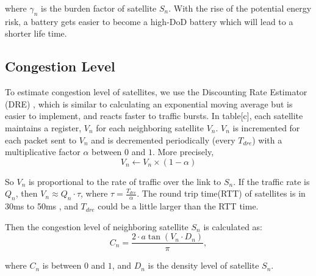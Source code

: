 where $\gamma_n$ is the burden factor of satellite $S_n$.
With the rise of the potential energy risk, a battery gets easier to become a high-DoD battery which will lead to a shorter life time.


\subsection{Congestion Level}
To estimate congestion level of satellites, we use the Discounting Rate Estimator (DRE) \cite{CONGA} , 
which is  similar to calculating an exponential moving average but is easier to implement,  and reacts faster to traffic bursts. 
In table[c], each satellite maintains a register, $V_n$ for each neighboring satellite $V_n$. 
$V_n$ is incremented for each packet sent to $V_n$  and is decremented periodically (every $T_{dre}$) with a multiplicative factor $\alpha$ between $0$ and $1$. More precisely,
\begin{equation}
 V_{n} \leftarrow V_{n} \times(1-\alpha) 
\label{eq:CONGA}
\end{equation}

So $V_n$ is proportional to the rate of traffic over the link to $S_n$. If the traffic rate is $Q_n$, then $V_n\approx Q_n \cdot \tau$, where $\tau = \frac{T_{dre}}{\alpha}$. The round trip time(RTT) of satellites is in 30ms to 50ms \cite{TELESAT}, and $T_{dre}$ could be a little larger than the RTT time.

Then the congestion level of neighboring satellite $S_n$ is calculated as:
\begin{equation}
 C_{n}=\frac{2 \cdot a \tan \left(V_{n} \cdot D_{n}\right)}{\pi} ,
\end{equation}

where $C_n$ is between $0$ and $1$, and $D_n$ is the density level of satellite $S_n$.




